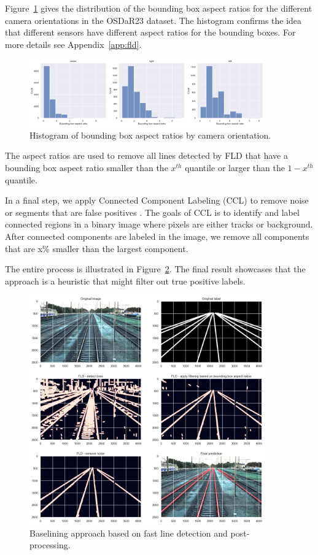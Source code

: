 \documentclass[Master,MDS,english]{BASE/twbook} %
\begin{document}
Figure~\ref{fig:bb_aspect_ratio_hist} gives the distribution of the bounding box aspect ratios for the different camera orientations in the OSDaR23 dataset. 
The histogram confirms the idea that different sensors have different aspect ratios for the bounding boxes. For more details see Appendix~\ref{app:fld}.


\begin{figure}[h]
\centering
\includegraphics[width=0.9\textwidth]{images/datasets/db/bb_ascpect_ratio_hist}
\caption{Histogram of bounding box aspect ratios by camera orientation. }
\label{fig:bb_aspect_ratio_hist}
\end{figure}

The aspect ratios are used to remove all lines detected by FLD that have a bounding box aspect ratio smaller than the $x^{th}$ quantile or larger than the $1-x^{th}$ quantile.

In a final step, we apply Connected Component Labeling (CCL) to remove noise or segments that are false positives \citep{CCL}. 
The goals of CCL is to identify and label connected regions in a binary image where pixels are either tracks or background. After connected components are labeled in the image, we remove all components that are x\% smaller than the largest component.

The entire process is illustrated in Figure~\ref{fig:fld_demo}. The final result showcases that the approach is a heuristic that might filter out true positive labels.

\begin{figure}[h]
\centering
\includegraphics[width=0.9\textwidth]{images/fld/fld_demo}
\caption{Baselining approach based on fast line detection and post-processing. }
\label{fig:fld_demo}
\end{figure}
\end{document}
